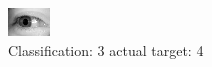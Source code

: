 \begin{figure}[h!]
\begin{center}
\includegraphics[width=0.60\columnwidth]{figures/ID3182_class_3_target_4.png}
\end{center}
\caption{ Classification: 3 actual target: 4}
\label{fig:ID3182_class_3_target_4}
\end{figure}
